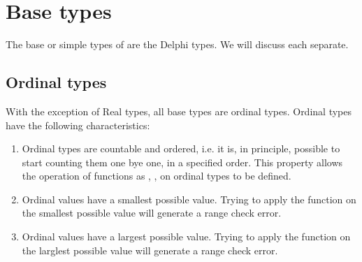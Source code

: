 \documentclass{report}
\begin{document}
\section{Base types}
The base or simple types of \fpc are the Delphi types. 
We will discuss each separate. 

\subsection{Ordinal types}
With the exception of Real types, all base types are ordinal types.
Ordinal types have the following characteristics:
\begin{enumerate}
\item Ordinal types are countable and ordered, i.e. it is, in principle,
possible to start counting them one bye one, in a specified order.
This property allows the operation of functions as , , 
on ordinal types to be defined.
\item Ordinal values have a smallest possible value. Trying to apply the
 function on the smallest possible value will generate a range
check error.
\item Ordinal values have a largest possible value. Trying to apply the
 function on the larglest possible value will generate a range
check error.
\end{enumerate}
\end{document}
